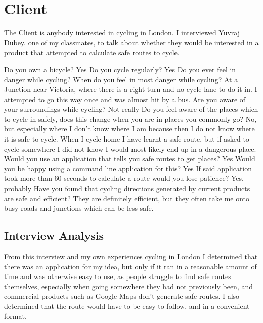\documentclass[11pt,twoside,a4paper]{report}
\begin{document}
\section{Client}
The Client is anybody interested in cycling in London. 
I interviewed Yuvraj Dubey, one of my classmates, to talk about whether they would be interested in a product that attempted to calculate safe routes to cycle. 
\begin{dialogue}
    Do you own a bicycle?
     Yes
     Do you cycle regularly?
     Yes
    Do you ever feel in danger while cycling?
    When do you feel in most danger while cycling?
    At a Junction near Victoria, where there is a right turn and no cycle lane to do it in. I attempted to go this way once and was almost hit by a bus.
    Are you aware of your surroundings while cycling?
    Not really
     Do you feel aware of the places which to cycle in safely, does this change when you are in places you commonly go?
    No, but especially where I don't know where I am because then I do not know where it is safe to cycle. When I cycle home I have learnt a safe route, but if asked to cycle somewhere I did not know I would most likely end up in a dangerous place.
    Would you use an application that tells you safe routes to get places?
    Yes
    Would you be happy using a command line application for this?
    Yes
    If said application took more than 60 seconds to calculate a route would you lose patience?
    Yes, probably
    Have you found that cycling directions generated by current products are safe and efficient?
    They are definitely efficient, but they often take me onto busy roads and junctions which can be less safe.
\end{dialogue}
\subsection{Interview Analysis}
From this interview and my own experiences cycling in London I determined that there was an application for my idea, but only if it ran in a reasonable amount of time and was otherwise easy to use, as people struggle to find safe routes themselves, especially when going somewhere they had not previously been, and commercial
products such as Google Maps don't generate safe routes. I also determined that the route would have to be easy to follow, and in a convenient format.
\newpage
\end{document}
